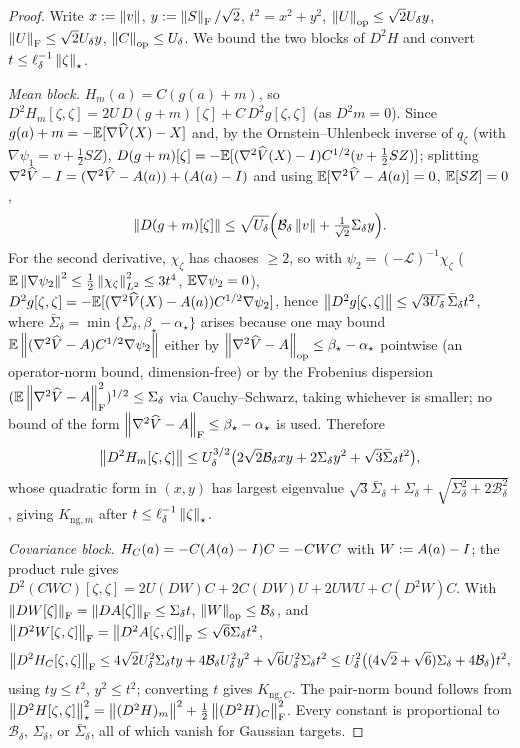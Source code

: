 \begin{proof}
Write $x:=\left\lVert v\right\rVert$, $y:=\left\lVert S\right\rVert_{\mathrm{F}}/\sqrt2$, $t^2=x^2+y^2$,
$\left\lVert U\right\rVert_{\mathrm{op}}\leq\sqrt2U_\delta y$, $\left\lVert U\right\rVert_{\mathrm{F}}\leq\sqrt2U_\delta y$,
$\left\lVert C\right\rVert_{\mathrm{op}}\leq U_\delta$. We bound the two blocks of $D^2H$ and convert
$t\leq\ell_\delta^{-1}\left\lVert \zeta\right\rVert_\star$.

\emph{Mean block.} $H_m(a)=C(g(a)+m)$, so
$D^2H_m[\zeta,\zeta]=2U\,D(g+m)[\zeta]+C\,D^2g[\zeta,\zeta]$ (as $D^2m=0$). Since
$g(a)+m=-\mathbb{E}[\nabla\widehat V(X)-X]$ and, by the Ornstein--Uhlenbeck inverse of $q_\zeta$
(with $\nabla\psi_1=v+\tfrac12SZ$),
$D(g+m)[\zeta]=-\mathbb{E}[(\nabla^2\widehat V(X)-I)C^{1/2}(v+\tfrac12SZ)]$; splitting
$\nabla^2\widehat V-I=(\nabla^2\widehat V-A(a))+(A(a)-I)$ and using
$\mathbb{E}[\nabla^2\widehat V-A(a)]=0$, $\mathbb{E}[SZ]=0$,
\[
    \left\lVert D(g+m)[\zeta]\right\rVert
    \leq\sqrt{U_\delta}\Bigl(\mathcal B_\delta\left\lVert v\right\rVert+\tfrac1{\sqrt2}\Sigma_\delta y\Bigr).
\]
For the second derivative, $\chi_\zeta$ has chaoses $\geq2$, so with
$\psi_2=(-\mathcal L)^{-1}\chi_\zeta$ ($\mathbb{E}\left\lVert \nabla\psi_2\right\rVert^2\leq\tfrac12\left\lVert \chi_\zeta\right\rVert_{L^2}^2\leq3t^4$,
$\mathbb{E}\nabla\psi_2=0$),
$D^2g[\zeta,\zeta]=-\mathbb{E}[(\nabla^2\widehat V(X)-A(a))C^{1/2}\nabla\psi_2]$, hence
$\left\lVert D^2g[\zeta,\zeta]\right\rVert\leq\sqrt{3U_\delta}\,\bar\Sigma_\delta t^2$, where
$\bar\Sigma_\delta=\min\{\Sigma_\delta,\beta_\star-\alpha_\star\}$ arises because one may
bound $\mathbb{E}\left\lVert (\nabla^2\widehat V-A)C^{1/2}\nabla\psi_2\right\rVert$ either by
$\left\lVert \nabla^2\widehat V-A\right\rVert_{\mathrm{op}}\leq\beta_\star-\alpha_\star$ pointwise (an operator-norm
bound, dimension-free) or by the Frobenius dispersion
$(\mathbb{E}\left\lVert \nabla^2\widehat V-A\right\rVert_{\mathrm{F}}^2)^{1/2}\leq\Sigma_\delta$ via Cauchy--Schwarz,
taking whichever is smaller; no bound of the form $\left\lVert \nabla^2\widehat V-A\right\rVert_{\mathrm{F}}\leq\beta_\star-\alpha_\star$
is used. Therefore
\[
    \left\lVert D^2H_m[\zeta,\zeta]\right\rVert
    \leq U_\delta^{3/2}\bigl(2\sqrt2\mathcal B_\delta xy+2\Sigma_\delta y^2+\sqrt3\bar\Sigma_\delta t^2\bigr),
\]
whose quadratic form in $(x,y)$ has largest eigenvalue
$\sqrt3\bar\Sigma_\delta+\Sigma_\delta+\sqrt{\Sigma_\delta^2+2\mathcal B_\delta^2}$, giving
$K_{\mathrm{ng},m}$ after $t\leq\ell_\delta^{-1}\left\lVert \zeta\right\rVert_\star$.

\emph{Covariance block.} $H_C(a)=-C(A(a)-I)C=-CWC$ with $W:=A(a)-I$; the product rule gives
$D^2(CWC)[\zeta,\zeta]=2U(DW)C+2C(DW)U+2UWU+C(D^2W)C$. With
$\left\lVert DW[\zeta]\right\rVert_{\mathrm{F}}=\left\lVert DA[\zeta]\right\rVert_{\mathrm{F}}\leq\Sigma_\delta t$,
$\left\lVert W\right\rVert_{\mathrm{op}}\leq\mathcal B_\delta$, and $\left\lVert D^2W[\zeta,\zeta]\right\rVert_{\mathrm{F}}=\left\lVert D^2A[\zeta,\zeta]\right\rVert_{\mathrm{F}}\leq\sqrt6\Sigma_\delta t^2$,
\[
    \left\lVert D^2H_C[\zeta,\zeta]\right\rVert_{\mathrm{F}}
    \leq4\sqrt2U_\delta^2\Sigma_\delta ty+4\mathcal B_\delta U_\delta^2y^2+\sqrt6U_\delta^2\Sigma_\delta t^2
    \leq U_\delta^2\bigl((4\sqrt2+\sqrt6)\Sigma_\delta+4\mathcal B_\delta\bigr)t^2,
\]
using $ty\leq t^2$, $y^2\leq t^2$; converting $t$ gives $K_{\mathrm{ng},C}$. The pair-norm
bound follows from $\left\lVert D^2H[\zeta,\zeta]\right\rVert_\star^2=\left\lVert (D^2H)_m\right\rVert^2+\tfrac12\left\lVert (D^2H)_C\right\rVert_{\mathrm{F}}^2$.
Every constant is proportional to $\mathcal B_\delta$, $\Sigma_\delta$, or $\bar\Sigma_\delta$,
all of which vanish for Gaussian targets.
\end{proof}

